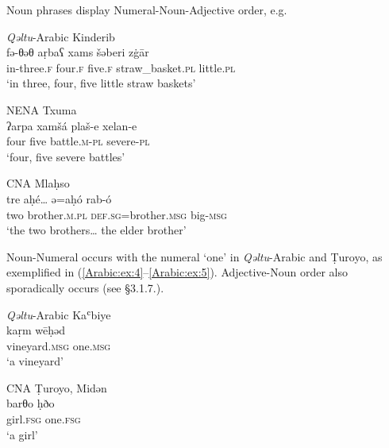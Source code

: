 \documentclass[output=paper,colorlinks,citecolor=brown,draftmode]{langscibook}
\begin{document}
Noun phrases display Numeral-Noun-Adjective order, e.g.

\ea\label{Arabic:ex:1}
\textit{Qəltu}-Arabic Kinderib \citep[2.5:§19]{Jastrow2003AKinderib}\\
\gll fə-θəθ aṛbaʕ xams šəberi zġār \\
     in-three\textsc{.f} four\textsc{.f} five\textsc{.f} straw\_basket.\textsc{pl} little\textsc{.pl} \\
\glt `in three, four, five little straw baskets'
\z

\ea\label{Arabic:ex:2}
NENA Txuma \citep[166.§16]{Talay2009NAKhaburAssyrer} \\
\gll ʔarpa xamšá plaš-e xelan-e \\
     four five battle\textsc{.m-pl} severe\textsc{-pl} \\
\glt `four, five severe battles' 
\z

\ea\label{Arabic:ex:3}
CNA Mlaḥso \citep[130.§137, §139]{Jastrow1994Mlahso}\\
\gll tre aḥé… ə=aḥó rab-ó  \\
     two brother\textsc{.m.pl} \textsc{def.sg=}brother\textsc{.msg} big\textsc{-msg} \\
\glt `the two brothers… the elder brother'
\z

Noun-Numeral occurs with the numeral `one' in \textit{Qəltu}-Arabic and Ṭuroyo, as exemplified in (\ref{Arabic:ex:4}--\ref{Arabic:ex:5}). Adjective-Noun order also sporadically occurs (see §3.1.7.).

\newpage
\ea\label{Arabic:ex:4}
\textit{Qəltu}-Arabic Kaʿbiye \citep[99]{Jastrow2022CADiyarbakir}\\
\gll kaṛm wēḥəd \\
     vineyard\textsc{.msg} one\textsc{.msg} \\
\glt `a vineyard' 
\z

\ea\label{Arabic:ex:5}
CNA Ṭuroyo, Midən \citep[275.§9]{Jastrow1985Laut} \\
\gll barθo ḥðo \\
     girl\textsc{.fsg} one\textsc{.fsg} \\
\glt `a girl' 
\z
\end{document}
